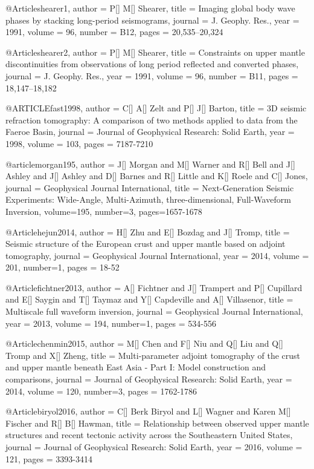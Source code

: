 @Article{shearer1,
  author = 	 {P[] M[] Shearer},
  title = 	 {Imaging global body wave phases by stacking long-period seismograms},
  journal = 	 {J. Geophy. Res.},
  year = 	 1991,
  volume = 	 96,
  number = 	 {B12},
  pages = 	 {20,535--20,324}}

@Article{shearer2,
  author = 	 {P[] M[] Shearer},
  title = 	 {Constraints on upper mantle discontinuities from observations
	of long period reflected and converted phases},
  journal = 	 {J. Geophy. Res.},
  year = 	 1991,
  volume = 	 96,
  number = 	 {B11},
  pages = 	 {18,147--18,182}}


@ARTICLE{fast1998,
  author = {C[] A[] Zelt and P[] J[] Barton},
  title = {3D seismic refraction tomography: A comparison of two methods applied to data from the Faeroe Basin},
  journal = {Journal of Geophysical Research: Solid Earth},
  year = {1998},
  volume = {103},
  pages = {7187-7210}
}


@article{morgan195,
author = {J[] Morgan and M[] Warner and R[] Bell and J[] Ashley and J[] Ashley and D[] Barnes and R[] Little and K[] Roele and C[] Jones},
journal = {Geophysical Journal International},
title = {Next-Generation Seismic Experiments: Wide-Angle, Multi-Azimuth, three-dimensional, Full-Waveform Inversion},
volume=195,
number=3,
pages=1657-1678
}

@Article{hejun2014,
  author = 	 {H[] Zhu and E[] Bozdag and J[] Tromp},
  title = 	 {Seismic structure of the European crust and upper mantle based on adjoint tomography},
  journal = 	 {Geophysical Journal International},
  year = 	 2014,
  volume = 201,
  number=1,
  pages =	 {18-52}
}

@Article{fichtner2013,
  author = 	 {A[] Fichtner and J[] Trampert and P[] Cupillard and E[] Saygin and T[] Taymaz and Y[] Capdeville and A[] Villasenor},
  title = 	 {Multiscale full waveform inversion},
  journal = 	 {Geophysical Journal International},
  year = 	 2013,
  volume = 194,
  number=1,
  pages =	 {534-556}
}

@Article{chenmin2015,
  author = 	 {M[] Chen and F[] Niu and Q[] Liu and Q[] Tromp and X[] Zheng},
  title = 	 {Multi‐parameter adjoint tomography of the crust and upper mantle beneath {E}ast {A}sia - {P}art I: {M}odel construction and comparisons},
  journal = 	 {Journal of Geophysical Research: Solid Earth},
  year = 	 2014,
  volume = 120,
  number=3,
  pages =	 {1762-1786}
}


@Article{biryol2016,
  author = 	 {C[] Berk Biryol and L[] Wagner and Karen M[] Fischer and R[] B[] Hawman},
  title = 	 {Relationship between observed upper mantle structures and recent tectonic activity across the Southeastern United States},
  journal = 	 {Journal of Geophysical Research: Solid Earth},
  year = 	 2016,
  volume = 121,
  pages =	 {3393-3414}
}

